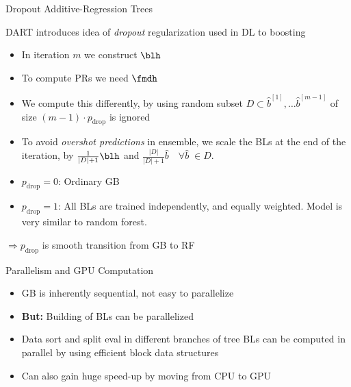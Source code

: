 \documentclass[11pt,compress,t,notes=noshow, xcolor=table]{beamer}
\begin{document}
\begin{vbframe}{Dropout Additive-Regression Trees}

  DART introduces idea of \emph{dropout} regularization used in DL to boosting

  \lz
  \begin{itemize}
      \item In iteration $m$ we construct $\blh$
      \item To compute PRs we need $\fmdh$
      \item We compute this differently, by using random subset $D \subset \hat{b}^{[1]}, \dots \hat{b}^{[m-1]}$ of size $(m-1) \cdot p_\text{drop}$ is ignored
      \item  To avoid \emph{overshot predictions} in ensemble, we scale the BLs at the end of the iteration, by $\frac{1}{|D| + 1}\blh$ and $\frac{|D|}{|D| + 1}\hat{b}\quad \forall \hat{b}\;\in D$.
  \end{itemize}

  \lz

  \begin{itemize}
    \item $p_\text{drop}=0$: Ordinary GB
    \item $p_\text{drop}=1$: All BLs are trained independently, and equally weighted. 
        Model is very similar to random forest.
  \end{itemize}
  $\Rightarrow p_\text{drop}$ is smooth transition from GB to RF



\end{vbframe}


\begin{vbframe}{Parallelism and GPU Computation}
  
    \begin{itemize}
        \item GB is inherently sequential, not easy to parallelize
        \item \textbf{But:} Building of BLs can be parallelized
        \item Data sort and split eval in different branches of tree BLs can be computed in parallel by using efficient block data structures
        \item Can also gain huge speed-up by moving from CPU to GPU
    \end{itemize}


\end{vbframe}
\end{document}
